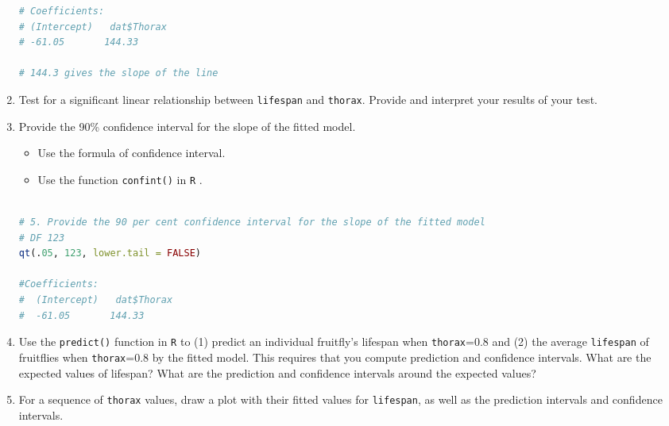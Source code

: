\documentclass[12pt,letterpaper]{article}
\begin{document}
\begin{enumerate}
\begin{lstlisting}[language=R]
# Coefficients:
# (Intercept)   dat$Thorax  
# -61.05       144.33 

# 144.3 gives the slope of the line 

\end{lstlisting}		
			
			
			
	\item
	Test for a significant linear relationship between  \texttt{lifespan} and \texttt{thorax}. Provide and interpret your results of your test.
	
\newpage
	\item
	
	Provide the 90\% confidence interval for the slope of the fitted model.
	
			\vspace{.5cm}
	\begin{itemize}
		\item
		Use the formula of confidence interval.		\vspace{.5cm}
		\item
		Use the function  \texttt{confint()}  in \texttt{R} .
	\end{itemize}
			\vspace{2cm}
			
	
								\begin{lstlisting}[language=R]

# 5. Provide the 90 per cent confidence interval for the slope of the fitted model
# DF 123
qt(.05, 123, lower.tail = FALSE)

#Coefficients:
#  (Intercept)   dat$Thorax  
#  -61.05       144.33 

\end{lstlisting}	
			
			
	\item Use the \texttt{predict()} function in \texttt{R} to (1) predict an individual fruitfly's lifespan when \texttt{thorax}=0.8 and (2) the average \texttt{lifespan} of fruitflies when \texttt{thorax}=0.8 by the fitted model. This requires that you compute prediction and confidence intervals. What are the expected values of lifespan? What are the prediction and confidence intervals around the expected values? 
	
			\vspace{6cm}
	\item	For a sequence of \texttt{thorax} values, draw a plot with their fitted values for \texttt{lifespan}, as well as the prediction intervals and confidence intervals.



\end{enumerate}
\end{document}
